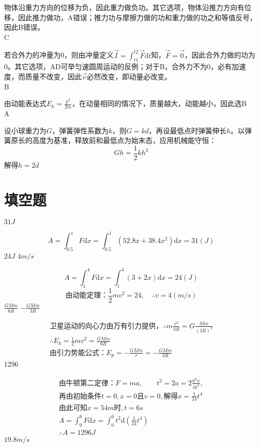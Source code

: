 \documentclass[b5paper,opensource]{./template/qyxf-book}
\newcommand{\di}[1]{\mathrm{d}#1}
\newcommand{\ddy}[2]{\frac{\mathrm{d} ^2 #1}{\mathrm{d} #2 ^2}}
\begin{document}
\solve
物体沿重力方向的位移为负，因此重力做负功。其它选项，物体沿推力方向有位移，因此推力做功，A错误；推力功与摩擦力做的功和重力做的功之和等值反号，因此B错误。\\
C

\solve
若合外力的冲量为0，则由冲量定义$\vec{I}=\int_{t1}^{t2}\vec{F}\di{t}$知，$\vec{F}=\vec{0}$，因此合外力做的功为0。其它选项，AD可举匀速圆周运动的反例；对于B，合外力不为0，必有加速度，而质量不改变，因此$\vec{v}$必然改变，即动量必改变。\\
B

\solve 
由动能表达式$E_k=\frac{p^2}{2m}$，在动量相同的情况下，质量越大，动能越小，因此选B\\
A

\solve
设小球重力为$G$，弹簧弹性系数为$k$，则$G=kd$，再设最低点时弹簧伸长$h$。以弹簧原长的高度为基准，释放前和最低点为始末态，应用机械能守恒：
\[Gh=\frac{1}{2}kh^2\]
解得$h=2d$

\section{填空题}

$31J$

\solve
\[A=\int_{0.5}^{1}F\di{x}=\int_{0.5}^{1}(52.8x+38.4x^2)\di{x}=31(J)\]
$24J$ $4m/s$

\solve
\[A=\int_{1}^{4}F\di{x}=\int_{1}^{4}(3+2x)\di{x}=24(J)\]
\[\text{由动能定理：}\frac{1}{2}mv^2=24,\quad \therefore v=4(m/s)\]
$\frac{GMm}{6R}$ \qquad $-\frac{GMm}{3R}$

\solve
\begin{gather*}
\text{卫星运动的向心力由万有引力提供，}\therefore m\frac{v^2}{3R}=G\frac{Mm}{(3R)^2}\\
\therefore E_k=\frac{1}{2}mv^2=\frac{GMm}{6R}\\
\text{由引力势能公式：}E_p=-\frac{GMm}{r}=-\frac{GMm}{3R}
\end{gather*}
1296

\solve
\begin{gather*}
\text{由牛顿第二定律：}F=ma,\qquad t^2=2a=2\ddy{x}{t},\\
\text{再由初始条件}t=0,x=0\text{且}v=0, \text{解得}x=\frac{1}{24}t^4\\
\text{由此可知}x=54m\text{时}, t=6s\\
A=\int_{0}^{6}F\di{x}=\int_{0}^{6}t^2\di{(\frac{1}{24}t^4)}\\
\therefore A=1296J
\end{gather*}
$19.8m/s$
\end{document}
